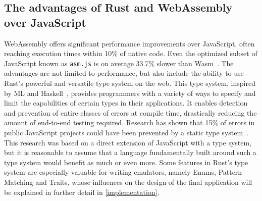 \subsection{The advantages of Rust and WebAssembly over JavaScript}
WebAssembly offers significant performance improvements over JavaScript, often reaching execution times within 10\% of native code. Even the optimized subset of JavaScript known as \verb+asm.js+ is on average 33.7\% slower than Wasm~\cite[Chapter~7.3]{wasmspeed}.
The advantages are not limited to performance, but also include the ability to use Rust's powerful and versatile type system on the web.
This type system, inspired by ML and Haskell~\cite{rustinfluences}, provides programmers with a variety of ways to specify and limit the capabilities of certain types in their applications.
It enables detection and prevention of entire classes of errors at compile time, drastically reducing the amount of end-to-end testing required. Research has shown that 15\% of errors in public JavaScript projects could have been prevented by a static type system~\cite{7985711}.
This research was based on a direct extension of JavaScript with a type system, but it is reasonable to assume that a language fundamentally built around such a type system would benefit as much or even more.
Some features in Rust's type system are especially valuable for writing emulators, namely Enums, Pattern Matching and Traits, whose influences on the design of the final application will be explained in further detail in \cref{implementation}.


